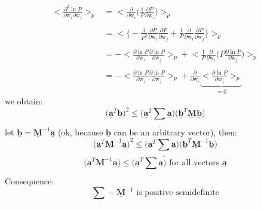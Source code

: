\documentclass[a4paper,11pt]{article}
\begin{document}
\begin{equation}
	\begin{array}{ll}
	\Big< \frac{\partial^2 \ln P}{\partial \mathrm{w}_i 
					\partial \mathrm{w}_j}
	\Big>_p 
	& = \Big< \frac{\partial}{\partial \mathrm{w}_i} 
		\Big( \frac{1}{P} \frac{\partial P}{\partial \mathrm{w}_i}
		\Big) \Big>_p \\\\
	& = \Big< \Big\{-\frac{1}{P^2} \frac{\partial P}{\partial \mathrm{w}_i}
		\frac{\partial P}{\partial \mathrm{w}_j} + \frac{1}{P} 
		\frac{\partial}{\partial \mathrm{w}_i} \frac{\partial P}{
			\partial \mathrm{w}_j} \Big\} \Big>_p\\\\
	& = -\Big< \frac{\partial \ln P}{\partial \mathrm{w}_i} 
		\frac{\partial \ln P}{\partial \mathrm{w}_j}
		\Big>_p + \Big< \frac{1}{P}
		\frac{\partial}{\partial \mathrm{w}_i} 
			\Big(P \frac{\partial \ln P}{\partial \mathrm{w}_j}
			\big) \Big>_p\\\\
	& = -\Big< \frac{\partial \ln P}{\partial \mathrm{w}_i} 
		\frac{\partial \ln P}{\partial \mathrm{w}_j} \Big>_p 
		+ \frac{\partial}{\partial \mathrm{w}_i} 
		\underbrace{\Big< \frac{\partial \ln P}{\partial 
					\mathrm{w}_j} \Big>_p}_{= 0}
	\end{array}
\end{equation}
we obtain:
\begin{equation}
	\big( \underline{\mathbf{a}}^T \underline{\mathbf{b}} \big)^2
	\leq \big( \underline{\mathbf{a}}^T 
		\underline{\sum} \underline{\mathbf{a}} \big)
		\big( \underline{\mathbf{b}}^T \underline{\mathbf{M}}
			\underline{\mathbf{b}} \big)
\end{equation}
let $\underline{\mathbf{b}} = \underline{\mathbf{M}}^{-1} 
\underline{\mathbf{a}}$ (ok, because $\underline{\mathbf{b}}$ can be an arbitrary vector), then:
\begin{equation}
	\big( \underline{\mathbf{a}}^T \underline{\mathbf{M}}^{-1} 
		\underline{\mathbf{a}} \big)^2 
	\leq \big( \underline{\mathbf{a}}^T \underline{\sum} 
		\underline{\mathbf{a}} \big)
		\big( \underline{\mathbf{b}}^T \underline{\mathbf{M}}^{-1} 
		\underline{\mathbf{b}} \big)
\end{equation}
\begin{equation}
	\big( \underline{\mathbf{a}}^T \underline{\mathbf{M}}^{-1} 
		\underline{\mathbf{a}} \big)
	\leq \big( \underline{\mathbf{a}}^T \underline{\sum}
		\underline{\mathbf{a}} \big) \text{ for all vectors 
			$\underline{\mathbf{a}}$}
\end{equation}
Consequence:
\begin{equation}
	\underline{\sum} - \underline{\mathbf{M}}^{-1} 
		\text{ is positive semidefinite}
\end{equation}
\end{document}
